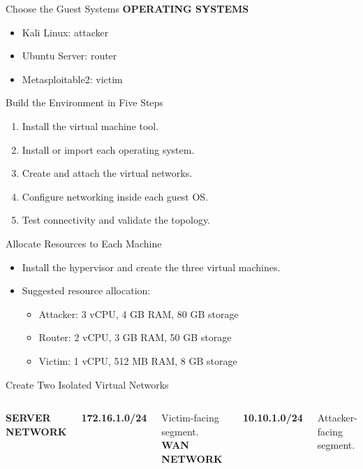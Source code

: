 \documentclass[aspectratio=169,11pt]{beamer}
\renewcommand{\SlideTag}[1]{%
  {\color{\FrameAccent}\fontsize{18}{22}\selectfont\bfseries #1}\par\vspace{0.25cm}%
}
\begin{document}
\begin{frame}{Choose the Guest Systems}
  \SlideTag{OPERATING SYSTEMS}
  \begin{itemize}
    \item Kali Linux: attacker
    \item Ubuntu Server: router
    \item Metasploitable2: victim
  \end{itemize}
\end{frame}

\begin{frame}{Build the Environment in Five Steps}
  \begin{enumerate}
    \item Install the virtual machine tool.
    \item Install or import each operating system.
    \item Create and attach the virtual networks.
    \item Configure networking inside each guest OS.
    \item Test connectivity and validate the topology.
  \end{enumerate}
\end{frame}

\begin{frame}{Allocate Resources to Each Machine}
  \begin{itemize}
    \item Install the hypervisor and create the three virtual machines.
    \item Suggested resource allocation:
      \begin{itemize}
        \item Attacker: 3 vCPU, 4 GB RAM, 80 GB storage
        \item Router: 2 vCPU, 3 GB RAM, 50 GB storage
        \item Victim: 1 vCPU, 512 MB RAM, 8 GB storage
      \end{itemize}
  \end{itemize}
\end{frame}

\begin{frame}{Create Two Isolated Virtual Networks}
  \begin{columns}[T,onlytextwidth]
      \SlideTag{SERVER NETWORK}
      {\color{ResearchColor}\fontsize{19}{23}\selectfont\bfseries 172.16.1.0/24\par}
      \vspace{0.3cm}Victim-facing segment.
      \SlideTag{WAN NETWORK}
      {\color{ResearchColor}\fontsize{19}{23}\selectfont\bfseries 10.10.1.0/24\par}
      \vspace{0.3cm}Attacker-facing segment.
  \end{columns}
\end{frame}
\end{document}
